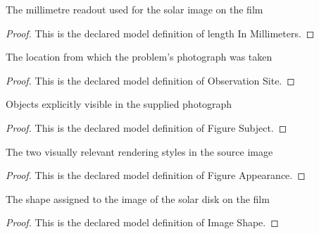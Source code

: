 \begin{definition}
  \label{def:physics:phyx-mini-0153:phyxminiproblems-problemphyxmini0153-lengthinmillimeters}
  The millimetre readout used for the solar image on the film
\end{definition}
\begin{proof}
  This is the declared model definition of length In Millimeters.
\end{proof}
\begin{definition}
  \label{def:physics:phyx-mini-0153:phyxminiproblems-problemphyxmini0153-observationsite}
  The location from which the problem's photograph was taken
\end{definition}
\begin{proof}
  This is the declared model definition of Observation Site.
\end{proof}
\begin{definition}
  \label{def:physics:phyx-mini-0153:phyxminiproblems-problemphyxmini0153-figuresubject}
  Objects explicitly visible in the supplied photograph
\end{definition}
\begin{proof}
  This is the declared model definition of Figure Subject.
\end{proof}
\begin{definition}
  \label{def:physics:phyx-mini-0153:phyxminiproblems-problemphyxmini0153-figureappearance}
  The two visually relevant rendering styles in the source image
\end{definition}
\begin{proof}
  This is the declared model definition of Figure Appearance.
\end{proof}
\begin{definition}
  \label{def:physics:phyx-mini-0153:phyxminiproblems-problemphyxmini0153-imageshape}
  The shape assigned to the image of the solar disk on the film
\end{definition}
\begin{proof}
  This is the declared model definition of Image Shape.
\end{proof}
